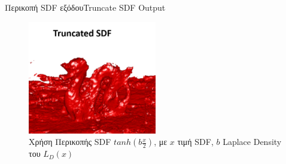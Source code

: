 \documentclass[10pt]{beamer}
\begin{document}
\begin{frame}{Περικοπή SDF εξόδου}{Truncate SDF Output}
    \begin{figure}
        \centering
        \includegraphics[width=0.5\textwidth]{images/TSDF.png}
        \caption{Χρήση Περικοπής SDF \(tanh(b \frac{x}{2})\), με \( x \) τιμή SDF, \( b \) Laplace Density του \( L_{D}(x) \)}
    \end{figure}
\end{frame}



\end{document}
